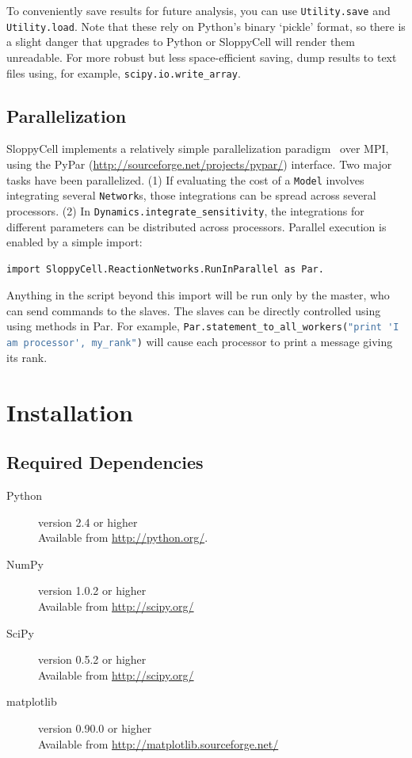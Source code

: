 \documentclass[12pt]{article}
\makeatletter
\newcommand{\py}[1]{\lstinline[language=Python, showstringspaces=False]@#1@}
\makeatother
\begin{document}
To conveniently save results for future analysis, you can use \py{Utility.save} and \py{Utility.load}.
Note that these rely on Python's binary `pickle' format, so there is a slight danger that upgrades to Python or SloppyCell will render them unreadable. For more robust but less space-efficient saving, dump results to text files using, for example, \py{scipy.io.write_array}.

\subsection{Parallelization\label{sec:user:parallel}}

SloppyCell implements a relatively simple parallelization paradigm~\cite{bib:Myers2007} over MPI, using the PyPar (\url{http://sourceforge.net/projects/pypar/}) interface.
Two major tasks have been parallelized.
(1) If evaluating the cost of a \py{Model} involves integrating several \py{Network}s, those integrations can be spread across several processors.
(2) In \py{Dynamics.integrate_sensitivity}, the integrations for different parameters can be distributed across processors.
Parallel execution is enabled by a simple import:
\begin{lstlisting}
import SloppyCell.ReactionNetworks.RunInParallel as Par.
\end{lstlisting}
Anything in the script beyond this import will be run only by the master, who can send commands to the slaves. 
The slaves can be directly controlled using using methods in Par.
For example, \py{Par.statement_to_all_workers("print 'I am processor', my_rank")} will cause each processor to print a message giving its rank.

\section{Installation}\label{sec:user:install}

\subsection{Required Dependencies}
\begin{description}

\item[Python] version 2.4 or higher\\
 Available from \url{http://python.org/}.

\item[NumPy] version 1.0.2 or higher\\
 Available from \url{http://scipy.org/}

\item[SciPy] version 0.5.2 or higher\\
 Available from \url{http://scipy.org/}

\item[matplotlib] version 0.90.0 or higher\\
 Available from \url{http://matplotlib.sourceforge.net/}
\end{description}
\end{document}

